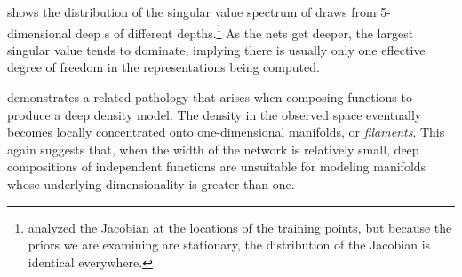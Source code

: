 %
 shows the distribution of the singular value spectrum of draws from 5-dimensional deep \gp{}s of different depths.\footnote{\citet{rifai2011contractive} analyzed the Jacobian at the locations of the training points, but because the priors we are examining are stationary, the distribution of the Jacobian is identical everywhere.}
As the nets get deeper, the largest singular value tends to dominate, implying there is usually only one effective degree of freedom in the representations being computed.

 demonstrates a related pathology that arises when composing functions to produce a deep density model.
The density in the observed space eventually becomes locally concentrated onto one-dimensional manifolds, or \emph{filaments}.
This again suggests that, when the width of the network is relatively small, deep compositions of independent functions are unsuitable for modeling manifolds whose underlying dimensionality is greater than one.

